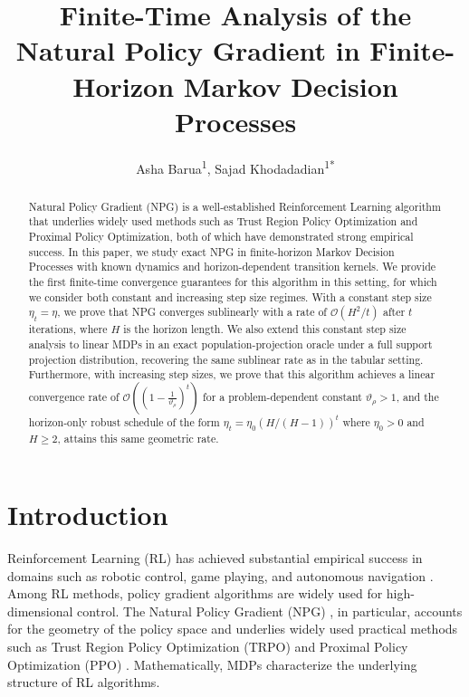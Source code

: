 \documentclass[11pt]{article}
\title{Finite-Time Analysis of the Natural Policy Gradient in
Finite-Horizon Markov Decision Processes}
\author{%
Asha Barua\textsuperscript{1}, 
Sajad Khodadadian\textsuperscript{1*}
}
\date{}
\begin{document}
\maketitle


\begingroup
\renewcommand{\thefootnote}{\fnsymbol{footnote}}
\endgroup
{}

\setcounter{footnote}{1}

\begin{abstract}
Natural Policy Gradient (NPG) is a well-established Reinforcement Learning algorithm that underlies widely used methods such as Trust Region Policy Optimization and Proximal Policy Optimization, both of which have demonstrated strong empirical success. In this paper, we study exact NPG in finite-horizon Markov Decision Processes with known dynamics and horizon-dependent transition kernels. We provide the first finite-time convergence guarantees for this algorithm in this setting, for which we consider both constant and increasing step size regimes. With a constant step size $\eta_t=\eta$, we prove that NPG converges sublinearly with a rate of $\mathcal{O}(H^{2}/t)$ after $t$ iterations, where $H$ is the horizon length. We also extend this constant step size analysis to linear MDPs in an exact population-projection oracle under a full support projection distribution, recovering the same sublinear rate as in the tabular
setting. Furthermore, with increasing step sizes, we prove that this algorithm achieves a linear convergence rate of $\mathcal{O}\left(\left(1-\frac{1}{\vartheta_\rho}\right)^t\right)$ for a problem-dependent constant $\vartheta_\rho > 1$, and the horizon-only robust schedule of the form $\eta_t=\eta_0(H/(H-1))^t$ where $\eta_0>0$ and $H \geq 2$, attains this same geometric rate.
\end{abstract}

\section{Introduction}
Reinforcement Learning (RL)
has achieved substantial empirical success in domains such as robotic control,
game playing, and autonomous navigation
\citep{singh2022reinforcement,silver2016mastering,arulkumaran2017deep}.
Among RL methods, policy gradient algorithms are widely used for
high-dimensional control. The Natural Policy Gradient (NPG)
\citep{kakade2001natural}, in particular, accounts for the geometry of the
policy space and underlies widely used practical methods such as Trust Region Policy
Optimization (TRPO) \citep{schulman2015trust} and Proximal Policy Optimization
(PPO) \citep{schulman2017proximal}. Mathematically, MDPs characterize the underlying structure of RL algorithms.
\end{document}
